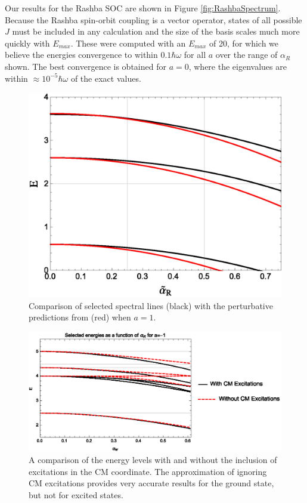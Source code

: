 \documentclass[%
 preprint,
 amsmath,amssymb,
 aps,
]{revtex4-1}
\begin{document}
Our results for the Rashba SOC are shown in Figure \ref{fig:RashbaSpectrum}. Because the Rashba spin-orbit coupling is a vector operator, states of all possible $J$ must be included in any calculation and the size of the basis scales much more quickly with $E_{max}$. These were computed with an $E_{max}$ of 20, for which we believe the energies convergence to within $0.1\hbar\omega$ for all $a$ over the range of $\alpha_R$ shown. The best convergence is obtained for $a=0$, where the eigenvalues are within $\approx 10^{-5} \hbar \omega$ of the exact values.

\begin{figure}
\includegraphics[height=0.4\linewidth]{Figures/ComparisonWithPertap1}
\caption{\label{fig:ComparisonSpectrum} Comparison of selected spectral lines (black) with the perturbative predictions from \cite{PhysRevA.89.033606} (red) when $a=1$. } 
\end{figure}

\begin{figure}
\includegraphics[width=0.9\linewidth]{Figures/NoCMa-1}
\caption{\label{fig:ComparisonSpectrum2} A comparison of the energy levels with and without the inclusion of excitations in the CM coordinate. The approximation of ignoring CM excitations provides very accurate results for the ground state, but not for excited states.} 
\end{figure}
\end{document}
